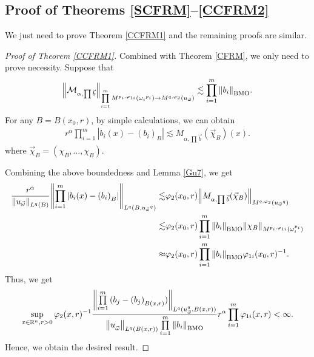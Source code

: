 \documentclass[11pt, twoside, leqno]{article}
\begin{document}
\subsection{Proof of Theorems \ref{SCFRM}--\ref{CCFRM2}}
We just need to prove Theorem \ref{CCFRM1} and the remaining proofs are similar.
\begin{proof}[Proof of Theorem \ref{CCFRM1}]
	Combined with Theorem \ref{CFRM}, we only need to prove necessity.
	Suppose that $${\left\| {\mathcal{M}_{\alpha, \prod \vec b }} \right\|_{\prod\limits_{i = 1}^m {{M^{{p_i},{\varphi _{1i}}}}\left( {{\omega _i}^{{p_i}}} \right)}  \to {M^{q,{\varphi _2}}}\left( {{u_{\vec \omega }}} \right)}} \lesssim \prod\limits_{i = 1}^m {{{\left\| {{b_i}} \right\|}_{\rm BMO}}}.$$
	For any $B=B(x_0,r)$, by simple calculations, we can obtain
	\begin{align*}
	{r^\alpha }\prod\limits_{i = 1}^m {\left| {{b_i}(x) - {{({b_i})}_B}} \right|}  \lesssim {M_{\alpha ,\prod {\vec b} }}({\vec \chi _B})(x).
	\end{align*}
	where ${{\vec \chi }_B} = ({\chi _B}, \ldots ,{\chi _B})$.
	
	Combining the above boundedness and Lemma \ref{Gu7}, we get
	\begin{align*}
	\frac{{{r^\alpha }}}{{{{\left\| {{u_{\vec \omega }}} \right\|}_{{L^q}(B)}}}}{\left\| {\prod\limits_{i = 1}^m {\left| {{b_i}(x) - {{({b_i})}_B}} \right|} } \right\|_{{L^q}(B,{u_{\vec \omega }}^q)}} \lesssim& {\varphi _2}({x_0},r){\left\| {{M_{\alpha ,\prod {\vec b} }}({{\vec \chi }_B})} \right\|_{{M^{q,{\varphi _2}}}({u_{\vec \omega }}^q)}}\notag\\ 
	\lesssim& {\varphi _2}({x_0},r)\prod\limits_{i = 1}^m {{{\left\| {{b_i}} \right\|}_{\rm BMO}}} {\left\| {{\chi _B}} \right\|_{{M^{{p_i},{\varphi _{1i}}}}(\omega _i^{{p_i}})}}\notag\\ 
	\approx& {\varphi _2}({x_0},r)\prod\limits_{i = 1}^m {{{\left\| {{b_i}} \right\|}_{\rm BMO}}} {\varphi _{1i}}{({x_0},r)^{ - 1}}.
	\end{align*}
	Thus, we get
	$$\mathop {\sup }\limits_{x \in {{\mathbb R^n}},r > 0} {\varphi _2}{(x,r)^{ - 1}}\frac{{{{\left\| {\prod\limits_{i = 1}^m {({b_j} - {{({b_j})}_{B(x,r)}})} } \right\|}_{{L^q}(u_{\vec \omega }^q,B(x,r))}}}}{{{{\left\| {u_{\vec \omega }^{}} \right\|}_{{L^q}(B(x,r))}}\prod\limits_{i = 1}^m {{{\left\| {{b_i}} \right\|}_{\rm BMO}}} }}{r^\alpha }\prod\limits_{i = 1}^m {{\varphi _{1i}}(x,r)}  < \infty.$$
	Hence, we obtain the desired result.
\end{proof}
\end{document}
